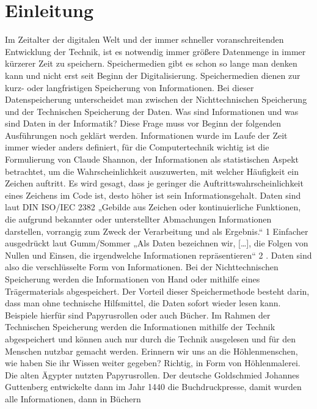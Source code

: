 
\chapter{Einleitung}
\label{ch:Einleitung}
Im Zeitalter der digitalen Welt und der immer schneller voranschreitenden Entwicklung der Technik, ist es 
notwendig immer größere Datenmenge in immer kürzerer Zeit zu speichern.  
Speichermedien gibt es schon so lange man denken kann und nicht erst seit Beginn der Digitalisierung. 
Speichermedien dienen zur kurz- oder langfristigen  Speicherung von Informationen. Bei dieser 
Datenspeicherung unterscheidet man zwischen der Nichttechnischen Speicherung und der Technischen 
Speicherung der Daten.  
Was sind Informationen und was sind Daten in der Informatik? Diese Frage muss vor Beginn der folgenden
Ausführungen noch geklärt werden.  
Informationen wurde im Laufe der Zeit immer wieder anders definiert, für die Computertechnik wichtig ist die 
Formulierung von Claude Shannon, der Informationen  als statistischen Aspekt betrachtet, um die 
Wahrscheinlichkeit auszuwerten, mit welcher Häufigkeit ein Zeichen auftritt. Es wird gesagt, dass je geringer die 
Auftrittswahrscheinlichkeit eines Zeichens im Code ist, desto höher ist sein Informationsgehalt.  
Daten sind laut DIN ISO/IEC 2382 „Gebilde aus Zeichen oder kontinuierliche Funktionen, die aufgrund 
bekannter oder unterstellter Abmachungen Informationen darstellen, vorrangig zum Zweck der Verarbeitung und 
als Ergebnis.“
1
Einfacher ausgedrückt laut Gumm/Sommer „Als Daten bezeichnen wir, […], die Folgen von Nullen und Einsen, 
die irgendwelche Informationen repräsentieren“
2
. Daten sind also die verschlüsselte Form von Informationen. 
Bei der Nichttechnischen Speicherung werden die Informationen von Hand oder mithilfe eines Trägermaterials 
abgespeichert. Der Vorteil dieser Speichermethode besteht darin, dass man ohne technische Hilfsmittel, die 
Daten sofort wieder lesen kann. Beispiele hierfür sind Papyrusrollen oder auch Bücher. 
Im Rahmen der Technischen Speicherung werden die Informationen mithilfe der Technik abgespeichert und 
können auch nur durch die Technik ausgelesen und für den Menschen nutzbar gemacht werden. 
Erinnern wir uns an die Höhlenmenschen, wie haben Sie ihr Wissen weiter gegeben? Richtig, in Form von 
Höhlenmalerei. Die alten Ägypter nutzten Papyrusrollen. Der deutsche Goldschmied Johannes Guttenberg 
entwickelte dann im Jahr 1440 die Buchdruckpresse,  damit wurden alle Informationen, dann in Büchern 
